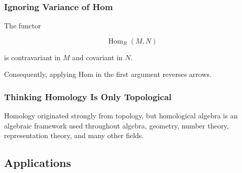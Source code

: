 \subsubsection{Ignoring Variance of Hom}

The functor

\[ \operatorname{Hom}_R(M,N) \]

is contravariant in \(M\) and covariant in \(N\).

Consequently, applying Hom in the first argument reverses arrows.

\subsubsection{Thinking Homology Is Only Topological}

Homology originated strongly from topology, but homological algebra is an
algebraic framework used throughout algebra, geometry, number theory,
representation theory, and many other fields.

\subsection{Applications}
\label{subsec:homological-algebra-applications}

